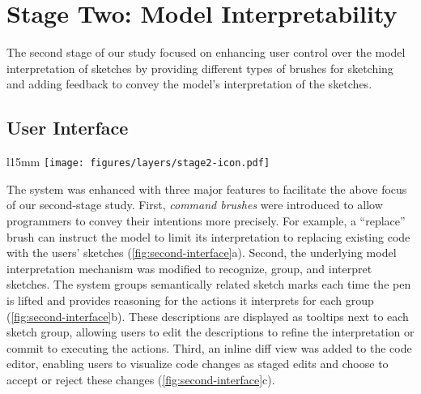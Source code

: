 

\section{Stage Two: Model Interpretability}
The second stage of our study focused on enhancing user control over the model interpretation of sketches by providing different types of brushes for sketching and adding feedback to convey the model's interpretation of the sketches. 

\subsection{User Interface}
\begin{wrapfigure}{l}{15mm}
\vspace{-3mm} \texttt{[image: figures/layers/stage2-icon.pdf]}
\end{wrapfigure} 
The system was enhanced with three major features to facilitate the above focus of our second-stage study. 
First, \textit{command brushes} were introduced to allow programmers to convey their intentions more precisely. For example, a ``replace'' brush can instruct the model to limit its interpretation to replacing existing code with the users' sketches (\autoref{fig:second-interface}a).
Second, the underlying model interpretation mechanism was modified to recognize, group, and interpret sketches. The system groups semantically related sketch marks each time the pen is lifted and provides reasoning for the actions it interprets for each group (\autoref{fig:second-interface}b). These descriptions are displayed as tooltips next to each sketch group, allowing users to edit the descriptions to refine the interpretation or commit to executing the actions.
Third, an inline diff view was added to the code editor, enabling users to visualize code changes as staged edits and choose to accept or reject these changes (\autoref{fig:second-interface}c).




